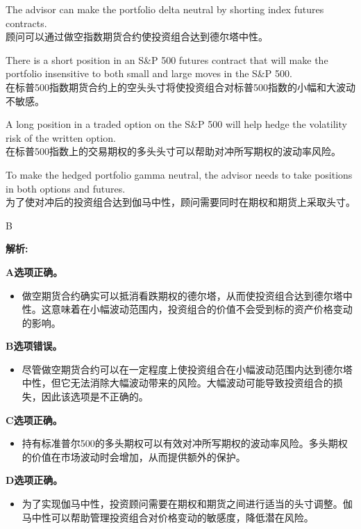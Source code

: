 \documentclass{article}
\newenvironment{explanation}
{\textbf{解析:}\par}
{\par}
\begin{document}
\begin{choices}
    \item The advisor can make the portfolio delta neutral by shorting index futures contracts.\\
    顾问可以通过做空指数期货合约使投资组合达到德尔塔中性。
    \item There is a short position in an S\&P 500 futures contract that will make the portfolio insensitive to both small and large moves in the S\&P 500.\\
    在标普500指数期货合约上的空头头寸将使投资组合对标普500指数的小幅和大波动不敏感。
    \item A long position in a traded option on the S\&P 500 will help hedge the volatility risk of the written option.\\
    在标普500指数上的交易期权的多头头寸可以帮助对冲所写期权的波动率风险。
    \item To make the hedged portfolio gamma neutral, the advisor needs to take positions in both options and futures.\\
    为了使对冲后的投资组合达到伽马中性，顾问需要同时在期权和期货上采取头寸。
\end{choices}

\begin{correctanswer}
    B
\end{correctanswer}

\begin{explanation}
    \textbf{A选项正确。}
    \begin{itemize}
        \item 做空期货合约确实可以抵消看跌期权的德尔塔，从而使投资组合达到德尔塔中性。这意味着在小幅波动范围内，投资组合的价值不会受到标的资产价格变动的影响。
    \end{itemize}

    \textbf{B选项错误。}
    \begin{itemize}
        \item 尽管做空期货合约可以在一定程度上使投资组合在小幅波动范围内达到德尔塔中性，但它无法消除大幅波动带来的风险。大幅波动可能导致投资组合的损失，因此该选项是不正确的。
    \end{itemize}

    \textbf{C选项正确。}
    \begin{itemize}
        \item 持有标准普尔500的多头期权可以有效对冲所写期权的波动率风险。多头期权的价值在市场波动时会增加，从而提供额外的保护。
    \end{itemize}

    \textbf{D选项正确。}
    \begin{itemize}
        \item 为了实现伽马中性，投资顾问需要在期权和期货之间进行适当的头寸调整。伽马中性可以帮助管理投资组合对价格变动的敏感度，降低潜在风险。
    \end{itemize}
\end{explanation}
\end{document}
